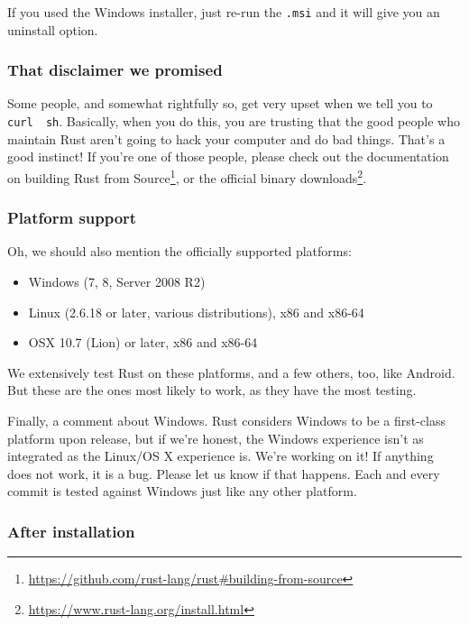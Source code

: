 \documentclass[a4paper,]{book}
\renewcommand{\href}[2]{#2\footnote{\url{#1}}}
\providecommand{\tightlist}{%
  \setlength{\itemsep}{0pt}\setlength{\parskip}{0pt}}
\begin{document}
If you used the Windows installer, just re-run the \texttt{.msi} and it
will give you an uninstall option.

\subsubsection{That disclaimer we
promised}\label{that-disclaimer-we-promised}

Some people, and somewhat rightfully so, get very upset when we tell you
to \texttt{curl\ \textbar{}\ sh}. Basically, when you do this, you are
trusting that the good people who maintain Rust aren't going to hack
your computer and do bad things. That's a good instinct! If you're one
of those people, please check out the documentation on
\href{https://github.com/rust-lang/rust\#building-from-source}{building
Rust from Source}, or \href{https://www.rust-lang.org/install.html}{the
official binary downloads}.

\subsubsection{Platform support}\label{platform-support}

Oh, we should also mention the officially supported platforms:

\begin{itemize}
\tightlist
\item
  Windows (7, 8, Server 2008 R2)
\item
  Linux (2.6.18 or later, various distributions), x86 and x86-64
\item
  OSX 10.7 (Lion) or later, x86 and x86-64
\end{itemize}

We extensively test Rust on these platforms, and a few others, too, like
Android. But these are the ones most likely to work, as they have the
most testing.

Finally, a comment about Windows. Rust considers Windows to be a
first-class platform upon release, but if we're honest, the Windows
experience isn't as integrated as the Linux/OS X experience is. We're
working on it! If anything does not work, it is a bug. Please let us
know if that happens. Each and every commit is tested against Windows
just like any other platform.

\subsubsection{After installation}\label{after-installation}
\end{document}
